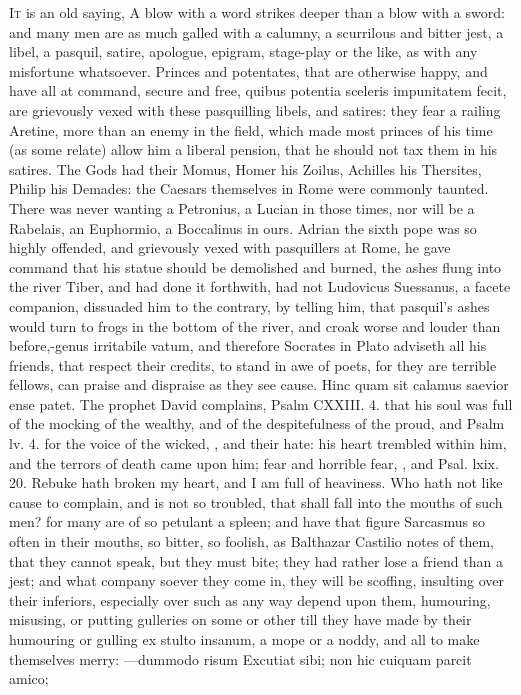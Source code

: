 {\lettrine{I}{t} is an old saying, A blow with a word strikes deeper than a
blow with a sword: and many men are as much galled with a calumny, a
scurrilous and bitter jest, a libel, a pasquil, satire, apologue,
epigram, stage-play or the like, as with any misfortune whatsoever.
Princes and potentates, that are otherwise happy, and have all at
command, secure and free, quibus potentia sceleris impunitatem fecit,
are grievously vexed with these pasquilling libels, and satires: they
fear a railing Aretine, more than an enemy in the field, which
made most princes of his time (as some relate) allow him a liberal
pension, that he should not tax them in his satires. The Gods had
their Momus, Homer his Zoilus, Achilles his Thersites, Philip his
Demades: the Caesars themselves in Rome were commonly taunted. There
was never wanting a Petronius, a Lucian in those times, nor will be a
Rabelais, an Euphormio, a Boccalinus in ours. Adrian the sixth pope
was so highly offended, and grievously vexed with pasquillers at
Rome, he gave command that his statue should be demolished and burned,
the ashes flung into the river Tiber, and had done it forthwith, had
not Ludovicus Suessanus, a facete companion, dissuaded him to the
contrary, by telling him, that pasquil's ashes would turn to frogs in
the bottom of the river, and croak worse and louder than before,-genus
irritabile vatum, and therefore Socrates in Plato adviseth all
his friends, that respect their credits, to stand in awe of poets, for
they are terrible fellows, can praise and dispraise as they see cause.
Hinc quam sit calamus saevior ense patet. The prophet David complains,
Psalm CXXIII. 4. that his soul was full of the mocking of the wealthy,
and of the despitefulness of the proud, and Psalm lv. 4. for the voice
of the wicked, \etc{}, and their hate: his heart trembled within him, and
the terrors of death came upon him; fear and horrible fear, \etc{}, and
Psal. lxix. 20. Rebuke hath broken my heart, and I am full of
heaviness. Who hath not like cause to complain, and is not so troubled,
that shall fall into the mouths of such men? for many are of so
petulant a spleen; and have that figure Sarcasmus so often in
their mouths, so bitter, so foolish, as Balthazar Castilio notes
of them, that they cannot speak, but they must bite; they had rather
lose a friend than a jest; and what company soever they come in, they
will be scoffing, insulting over their inferiors, especially over such
as any way depend upon them, humouring, misusing, or putting gulleries
on some or other till they have made by their humouring or gulling
ex stulto insanum, a mope or a noddy, and all to make themselves
merry:
---dummodo risum
Excutiat sibi; non hic cuiquam parcit amico;

}
